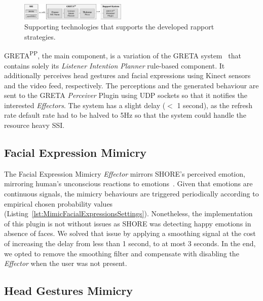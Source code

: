 \begin{figure}[H]
	\centering
	\includegraphics[width=0.45\textwidth]{figures/SupportingTechnologiesOverview.png}
	\caption{Supporting technologies that supports the developed rapport strategies.}
	\label{fig:SupportingTechnologiesOverview}
\end{figure}

GRETA\textsuperscript{PP}, the main component, is a variation of the GRETA system~\cite{Niewiadomski2009} that contains solely its \textit{Listener Intention Planner} rule-based component. It additionally perceives head gestures and facial expressions using Kinect sensors and the video feed, respectively. The perceptions and the generated behaviour are sent to the GRETA \textit{Perceiver} Plugin using \ac{UDP} sockets so that it notifies the interested \textit{Effectors}. The system has a slight delay ($<$ 1 second), as the refresh rate default rate had to be halved to 5Hz so that the system could handle the resource heavy \ac{SSI}.


\subsection{Facial Expression Mimicry}

The Facial Expression Mimicry \textit{Effector} mirrors SHORE's perceived emotion, mirroring human's unconscious reactions to emotions~\cite{Dimberg2000}. Given that emotions are continuous signals, the mimicry behaviours are triggered periodically according to empirical chosen probability values (Listing~\ref{lst:MimicFacialExpressionsSettings}). Nonetheless, the implementation of this plugin is not without issues as SHORE was detecting happy emotions in absence of faces. We solved that issue by applying a smoothing signal at the cost of increasing the delay from less than 1 second, to at most 3 seconds. In the end, we opted to remove the smoothing filter and compensate with disabling the \textit{Effector} when the user was not present.

\subsection{Head Gestures Mimicry}

